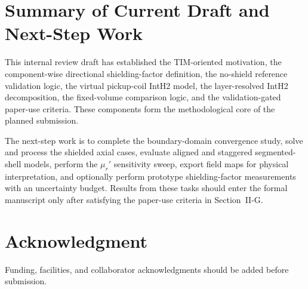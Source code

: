 ﻿\documentclass[letterpaper,journal]{IEEEtran}
\begin{document}
\section{Summary of Current Draft and Next-Step Work}

This internal review draft has established the TIM-oriented motivation, the component-wise directional shielding-factor definition, the no-shield reference validation logic, the virtual pickup-coil IntH2 model, the layer-resolved IntH2 decomposition, the fixed-volume comparison logic, and the validation-gated paper-use criteria. These components form the methodological core of the planned submission.

The next-step work is to complete the boundary-domain convergence study, solve and process the shielded axial cases, evaluate aligned and staggered segmented-shell models, perform the $\mu_r'$ sensitivity sweep, export field maps for physical interpretation, and optionally perform prototype shielding-factor measurements with an uncertainty budget. Results from these tasks should enter the formal manuscript only after satisfying the paper-use criteria in Section~II-G.
\section*{Acknowledgment}
Funding, facilities, and collaborator acknowledgments should be added before submission.
\end{document}
